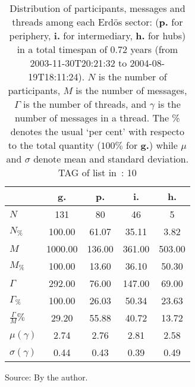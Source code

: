 \begin{table}[h!]
\begin{center}
\caption{Distribution of participants, messages and threads among each Erd\"os sector: ({\bf p.} for periphery, {\bf i.} for intermediary, 
    {\bf h.} for hubs) in a total timespan of 0.72 years (from 2003-11-30T20:21:32 to 2004-08-19T18:11:24). $N$ is the number of participants, $M$ is the number of messages, $\Gamma$ is the number of threads, and $\gamma$ is the number of messages in a thread.
    The \% denotes the usual `per cent' with respecto to the total quantity ($100\%$ for {\bf g.})
	while $\mu$ and $\sigma$ denote mean and standard deviation. TAG of list in~\cite{textTables}: 10}\label{geralListas}    
\begin{tabular}{| l || c | c | c | c |}\hline
 & {\bf g.} & {\bf p.} & {\bf i.} & {\bf h.} \\\hline\hline
$N$ & 131  & 80  & 46  & 5 \\
$N_{\%}$ & 100.00  & 61.07  & 35.11  & 3.82 \\\hline
$M$ & 1000.00  & 136.00  & 361.00  & 503.00 \\
$M_{\%}$ & 100.00  & 13.60  & 36.10  & 50.30 \\\hline
$\Gamma$ & 292.00  & 76.00  & 147.00  & 69.00 \\
$\Gamma_{\%}$ & 100.00  & 26.03  & 50.34  & 23.63 \\\hline
$\frac{\Gamma}{M}\%$ & 29.20  & 55.88  & 40.72  & 13.72 \\
$\mu(\gamma)$ & 2.74  & 2.76  & 2.81  & 2.58 \\
$\sigma(\gamma)$ & 0.44  & 0.43  & 0.39  & 0.49 \\\hline
\end{tabular}
\end{center}
\begin{flushleft}\footnotesize
		Source: By the author.\
\end{flushleft}
\end{table}
